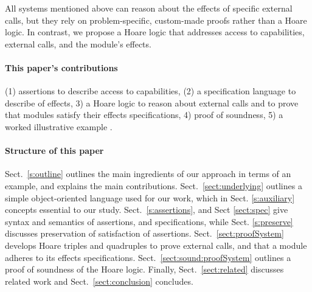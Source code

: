 \vspace{.1cm}

All  systems mentioned above can reason about the effects of specific external calls, but they rely on problem-specific, custom-made proofs rather than a Hoare logic.
 In contrast, we propose a Hoare logic that addresses access to capabilities, external calls, and the module's \tamed effects.

  
\paragraph{This paper's contributions} %
{(1) assertions to describe   access to capabilities}, 
(2) a specification language to describe \taming of effects,
3) a Hoare logic to reason about external calls and to prove that modules satisfy their \tamed effects specifications,
4)  proof of soundness,
5) a worked illustrative example .
 

 \paragraph{Structure of this paper}
Sect.\ \ref{s:outline}   outlines the main ingredients of our approach in terms of an example, and explains the main contributions.
Sect.\ \ref{sect:underlying} outlines a simple object-oriented language used for our work, which in Sect. \ref{s:auxiliary}  concepts essential to  our study.
Sect.\ \ref{s:assertions}, and Sect \ref{sect:spec}  give syntax and semantics of assertions, and  specifications,
{while Sect. \ref{s:preserve} discusses preservation of satisfaction of assertions.}
Sect.\ \ref{sect:proofSystem} develops Hoare triples and quadruples to prove external calls, and that a module adheres to its \tamed effects specifications.
Sect.\ \ref{sect:sound:proofSystem} outlines a proof of soundness of
the Hoare logic. Finally, Sect.\ \ref{sect:related} discusses related
work and Sect.\ \ref{sect:conclusion} concludes. 
 
 

